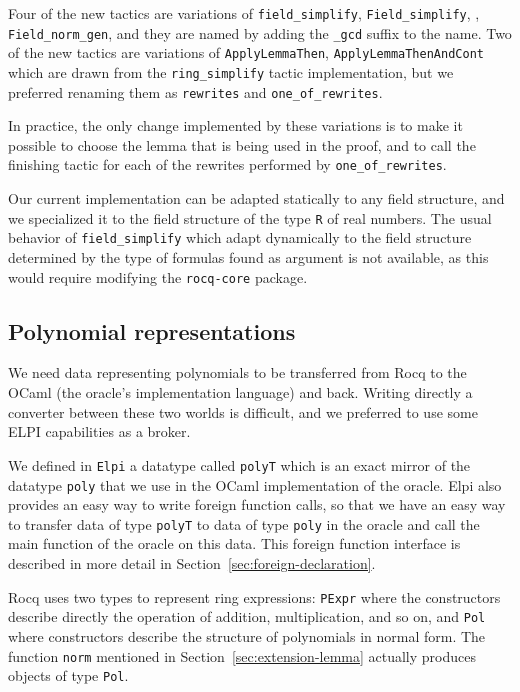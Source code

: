 \documentclass[11pt]{article}
\begin{document}
Four of the new tactics are variations of {\tt field\_simplify},
{\tt Field\_simplify}, , {\tt
  Field\_norm\_gen}, and they are named by adding the {\tt \_gcd}
suffix to the name.  Two of the new tactics are variations of
{\tt ApplyLemmaThen}, {\tt ApplyLemmaThenAndCont} which
are drawn from the {\tt ring\_simplify} tactic implementation, but we
preferred renaming them as {\tt rewrites} and {\tt one\_of\_rewrites}.

In practice, the only change implemented by these variations is to
make it possible to choose the lemma that is being used in the proof,
and to call the finishing tactic for each of the rewrites performed by
{\tt one\_of\_rewrites}.

Our current implementation can be adapted statically to any field structure,
and we specialized it to the field structure of the type {\tt R} of real
numbers.  The usual behavior of {\tt field\_simplify} which adapt
dynamically to the field structure determined by the type of formulas found
as argument is not available, as this would require modifying the
{\tt rocq-core} package.
\subsection{Polynomial representations}

We need data representing polynomials to be transferred from Rocq to the OCaml (the oracle's implementation language) and back.  Writing directly a converter between these two worlds is difficult, and we preferred to use some ELPI capabilities as a broker.

We defined in {\tt Elpi} a datatype called {\tt polyT} which is an exact mirror
of the datatype {\tt poly} that we use in the OCaml implementation of the
oracle.  Elpi also provides an easy way to write foreign function calls, so
that we have an easy way to transfer data of type {\tt polyT} to data of type {\tt poly} in the oracle and call the main function of the oracle on this data.  This foreign function interface is described in more detail in Section~\ref{sec:foreign-declaration}.

Rocq uses two types to represent ring expressions: {\tt PExpr} where the
constructors describe directly the operation of addition, multiplication, and
so on, and {\tt Pol} where constructors describe the structure of polynomials
in normal form.  The function {\tt norm} mentioned in
Section~\ref{sec:extension-lemma} actually produces objects of type {\tt Pol}.
\end{document}

